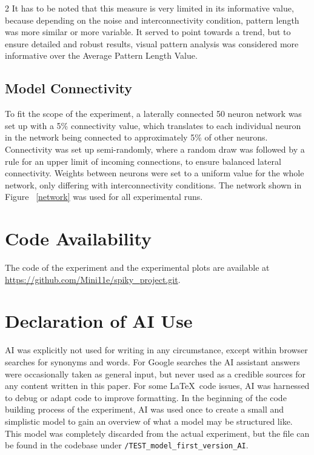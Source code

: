 \documentclass[12pt,a4paper]{article}
\begin{document}
\begin{multicols}{2}
            It has to be noted that this measure is very limited in its informative value, because depending on the noise and interconnectivity condition, pattern length was more similar or more variable. It served to point towards a trend, but to ensure detailed and robust results, visual pattern analysis was considered more informative over the Average Pattern Length Value.

        \subsection{Model Connectivity}
            To fit the scope of the experiment, a laterally connected 50 neuron network was set up with a 5\% connectivity value, which translates to each individual neuron in the network being connected to approximately 5\% of other neurons. Connectivity was set up semi-randomly, where a random draw was followed by a rule for an upper limit of incoming connections, to ensure balanced lateral connectivity. Weights between neurons were set to a uniform value for the whole network, only differing with interconnectivity conditions. The network shown in Figure ~\ref{network} was used for all experimental runs.
        
        \section{Code Availability}
            The code of the experiment and the experimental plots are available at \url{https://github.com/Mini11e/spiky\_project.git}.
        
        \section{Declaration of AI Use}
            AI was explicitly not used for writing in any circumstance, except within browser searches for synonyms and words. For Google searches the AI assistant answers were occasionally taken as general input, but never used as a credible sources for any content written in this paper. For some \LaTeX\ code issues, AI was harnessed to debug or adapt code to improve formatting. In the beginning of the code building process of the experiment, AI was used once to create a small and simplistic model to gain an overview of what a model may be structured like. This model was completely discarded from the actual experiment, but the file can be found in the codebase under \verb|/TEST_model_first_version_AI|.

    
    \printbibliography
    \end{multicols}
\end{document}
